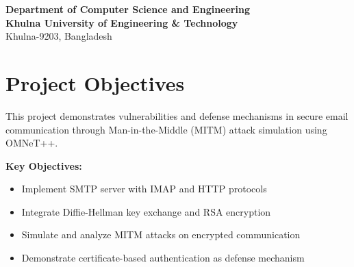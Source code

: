 \documentclass[a4paper,12pt]{extarticle}
\begin{document}
\begin{titlepage}
    \vfill
    
    \begin{tcolorbox}[
        colback=maincolor,
        colframe=maincolor,
        width=\textwidth,
        arc=0mm,
        boxrule=0pt,
        halign=center,
        left=5pt, right=5pt, top=10pt, bottom=10pt
    ]
        {\fontsize{12}{15}\selectfont \color{white}\textbf{Department of Computer Science and Engineering}}\\
        {\fontsize{12}{15}\selectfont \color{white}\textbf{Khulna University of Engineering \& Technology}}\\
        {\fontsize{11}{14}\selectfont \color{white}Khulna-9203, Bangladesh}\\[0.2cm]
    \end{tcolorbox}
    
\end{titlepage}

\newpage
\pagestyle{fancy}  %




\tableofcontents

\newpage

\listoffigures



\newpage


\section{Project Objectives}

This project demonstrates vulnerabilities and defense mechanisms in secure email communication through Man-in-the-Middle (MITM) attack simulation using OMNeT++.

\textbf{Key Objectives:}
\begin{itemize}[label={\color{accentcolor}$\blacktriangleright$}]
    \item Implement SMTP server with IMAP and HTTP protocols
    \item Integrate Diffie-Hellman key exchange and RSA encryption
    \item Simulate and analyze MITM attacks on encrypted communication
    \item Demonstrate certificate-based authentication as defense mechanism
\end{itemize}
\end{document}
